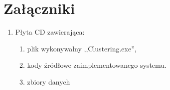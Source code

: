 \chapter*{Załączniki}
\begin{enumerate}
	\item Płyta CD zawierająca:
	\begin{enumerate}
		\item plik wykonywalny ,,Clustering.exe'',
		\item kody źródłowe zaimplementowanego systemu.
		\item zbiory danych
	\end{enumerate}
\end{enumerate}